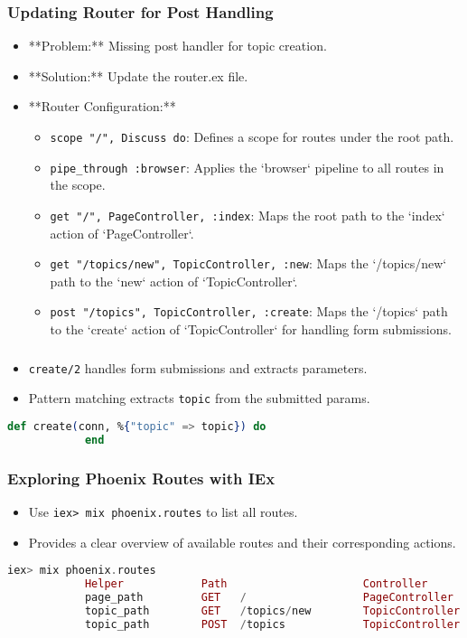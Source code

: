 \documentclass[aspectratio=169, table]{beamer}
\begin{document}
	\begin{frame}
		\frametitle{Updating Router for Post Handling}
		\begin{itemize}
			\item **Problem:** Missing post handler for topic creation.
			\item **Solution:** Update the router.ex file.
			\item **Router Configuration:**
			\begin{itemize}
				\item \texttt{scope "/", Discuss do}: Defines a scope for routes under the root path.
				\item \texttt{pipe\_through :browser}: Applies the `browser` pipeline to all routes in the scope.
				\item \texttt{get "/", PageController, :index}: Maps the root path to the `index` action of `PageController`.
				\item \texttt{get "/topics/new", TopicController, :new}: Maps the `/topics/new` path to the `new` action of `TopicController`.
				\item \texttt{post "/topics", TopicController, :create}: Maps the `/topics` path to the `create` action of `TopicController` for handling form submissions.
			\end{itemize}
		\end{itemize}
	\end{frame}
	
	\begin{frame}[fragile]
		\frametitle{}
		\begin{itemize}
			\item \texttt{create/2} handles form submissions and extracts parameters.
			\item Pattern matching extracts \texttt{topic} from the submitted params.
		\end{itemize}
		\begin{lstlisting}[language=Elixir]
			def create(conn, %{"topic" => topic}) do
			end
		\end{lstlisting}
	\end{frame}
	
	\begin{frame}[fragile]
		\frametitle{Exploring Phoenix Routes with IEx}
		\begin{itemize}
			\item Use \texttt{iex> mix phoenix.routes} to list all routes.
			\item Provides a clear overview of available routes and their corresponding actions.
		\end{itemize}
		\begin{lstlisting}[language=Elixir]
			iex> mix phoenix.routes
			Helper            Path                     Controller
			page_path         GET   /                  PageController :index
			topic_path        GET   /topics/new        TopicController :new
			topic_path        POST  /topics            TopicController :create
		\end{lstlisting}
	\end{frame}
	
\end{document}
